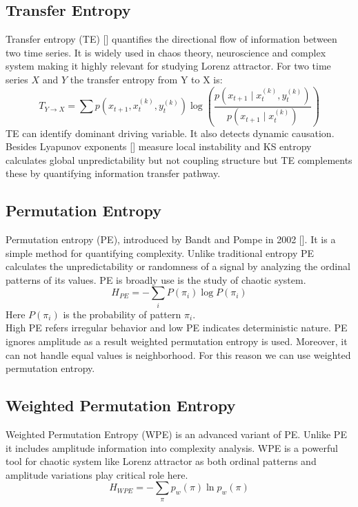 \documentclass[%
 reprint,
 amsmath,amssymb,
 aps,
 floatfix,
]{revtex4-2}
\begin{document}
\subsection{Transfer Entropy}
Transfer entropy (TE) [] quantifies the directional flow of information between two time series. It is widely used in chaos theory, neuroscience and complex system making it highly relevant for studying Lorenz attractor. For two time series $X$ and $Y$ the transfer entropy from Y to X is:
\begin{equation}
T_{Y\to X} = \sum p(x_{t+1}, x_{t}^{(k)}, y_{t}^{(k)}) \log\left( \frac{p(x_{t+1} \mid x_{t}^{(k)}, y_{t}^{(k)})}{p(x_{t+1} \mid x_{t}^{(k)})} \right)
\end{equation}
TE can identify dominant driving variable. It also detects dynamic causation. Besides Lyapunov exponents [] measure local instability and KS entropy calculates global unpredictability but not coupling structure but TE complements these by quantifying information transfer pathway.
\subsection{Permutation Entropy}
Permutation entropy (PE), introduced by Bandt and Pompe in 2002 []. It is a simple method for quantifying complexity. Unlike traditional entropy PE calculates the unpredictability or randomness of a signal by analyzing the ordinal patterns of its values. PE is broadly use is the study of chaotic system.
\begin{equation}
	H_{PE} = -\sum_{i} P(\pi_i) \log P(\pi_i)
\end{equation}
Here $P(\pi_i)$ is the probability of pattern $\pi_i$.\\
High PE refers irregular behavior and low PE indicates deterministic nature. PE ignores amplitude as a result weighted permutation entropy is used. Moreover, it can not handle equal values is neighborhood. For this reason we can use weighted permutation entropy.
\subsection{Weighted Permutation Entropy}
Weighted Permutation Entropy (WPE) is an advanced variant of PE. Unlike PE it includes amplitude information into complexity analysis. WPE is a powerful tool for chaotic system like Lorenz attractor as both ordinal patterns and amplitude variations play critical role here.
\begin{equation} 
	H_{WPE} = -\sum_{\pi} p_w(\pi) \ln p_w (\pi)
\end{equation} 
\end{document}
